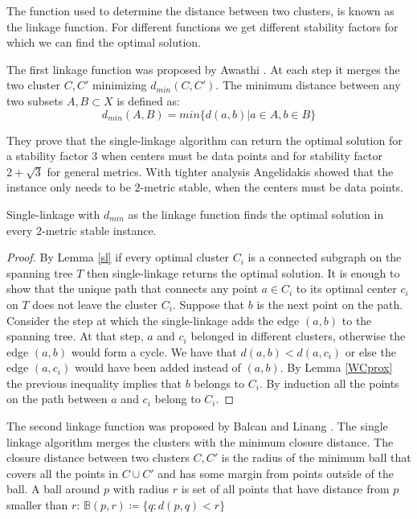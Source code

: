 The function used to determine the distance between two clusters, is known as the linkage function. For different functions we get different stability factors for which we can find the optimal solution. 

The first linkage function was proposed by Awasthi \cite{Awasthi2012}. At each step it merges the two cluster $C,C'$ minimizing $d_{min}(C,C')$. The minimum distance between any two subsets $A,B \subset X$ is defined as:
\[ d_{min}(A,B) = min \{ d(a,b) | a\in A, b\in B\} \]

They prove that the single-linkage algorithm can return the optimal solution for a stability factor $3$ when centers must be data points and for stability factor $2+\sqrt{3}$ for general metrics. With tighter analysis Angelidakis showed \cite{Angelidakis2017} that the instance only needs to be $2$-metric stable, when the centers must be data points.

\begin{lemma}
Single-linkage with $d_{min}$ as the linkage function finds the optimal solution in every $2$-metric stable instance. 
\end{lemma}

\begin{proof}
By Lemma \ref{sl} if every optimal cluster $C_i$ is a connected subgraph on the spanning tree $T$ then single-linkage returns the optimal solution. It is enough to show that the unique path that connects any point $a \in C_i$ to its optimal center $c_i$ on $T$ does not leave the cluster $C_i$. Suppose that $b$ is the next point on the path. Consider the step at which the single-linkage adds the edge $(a,b)$ to the spanning tree. At that step, $a$ and $c_i$ belonged in different clusters, otherwise the edge $(a,b)$ would form a cycle. We have that $d(a,b)<d(a,c_i)$ or else the edge $(a,c_i)$ would have been added instead of $(a,b)$. By Lemma \ref{WCprox} the previous inequality implies that $b$ belongs to $C_i$.  By induction all the points on the path between $a$ and $c_i$ belong to $C_i$.  
\end{proof}






The second linkage function was proposed by Balcan and Linang \cite{Balcan2011}. The single linkage algorithm merges the clusters with the minimum closure distance. The closure distance between two clusters $C,C'$ is the radius of the minimum ball that covers all the points in $C \cup C'$ and has some margin from points outside of the ball. A ball around $p$ with radius $r$ is set of all points that have distance from $p$ smaller than $r$: $\mathbb{B}(p,r) \coloneqq \{ q : d(p,q) <r \}$ 



